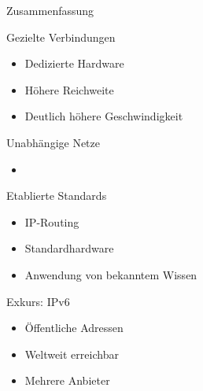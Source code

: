 \documentclass{beamer}
\begin{document}
	\begin{frame}{Zusammenfassung}
		\begin{block}{Gezielte Verbindungen}
		\begin{itemize}
			\item Dedizierte Hardware
			\item Höhere Reichweite
			\item Deutlich höhere Geschwindigkeit
		\end{itemize}
		\end{block}
		\begin{block}{Unabhängige Netze}
		\begin{itemize}
			\item
		\end{itemize}
		\end{block}
		\begin{block}{Etablierte Standards}
		\begin{itemize}
			\item IP-Routing
			\item Standardhardware
			\item Anwendung von bekanntem Wissen
		\end{itemize}
		\end{block}
	\end{frame}

	\begin{frame}{Exkurs: IPv6}
		\begin{itemize}
			\item Öffentliche Adressen
			\item Weltweit erreichbar
			\item Mehrere Anbieter
		\end{itemize}
	\end{frame}

\end{document}
